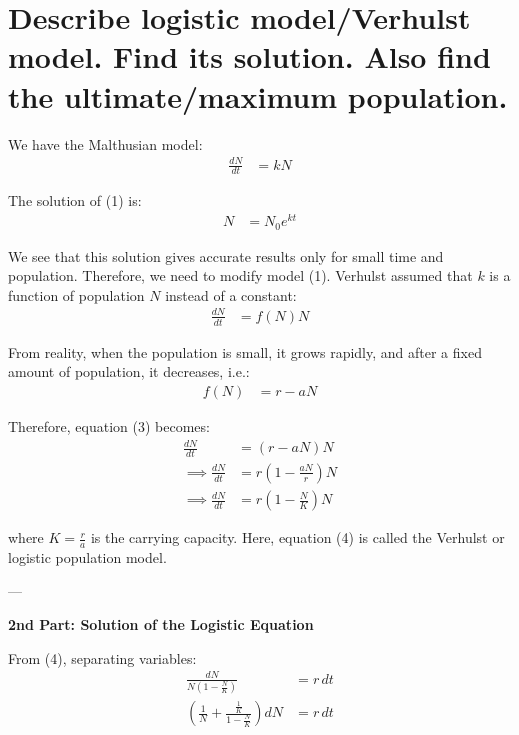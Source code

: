 \section{Describe logistic model/Verhulst model. Find its solution. Also find the ultimate/maximum population.}
We have the Malthusian model:
\begin{align*}
    \frac{dN}{dt} &= kN \tag{1}
\end{align*}

The solution of (1) is:
\begin{align*}
    N &= N_0 e^{kt} \tag{2}
\end{align*}

We see that this solution gives accurate results only for small time and population. Therefore, we need to modify model (1). Verhulst assumed that $k$ is a function of population $N$ instead of a constant:
\begin{align*}
    \frac{dN}{dt} &= f(N) N \tag{3}
\end{align*}

From reality, when the population is small, it grows rapidly, and after a fixed amount of population, it decreases, i.e.:
\begin{align*}
    f(N) &= r - aN
\end{align*}

Therefore, equation (3) becomes:
\begin{align*}
    \frac{dN}{dt} &= (r - aN) N \\
    \implies \frac{dN}{dt} &= r \left(1 - \frac{aN}{r}\right) N \\
    \implies \frac{dN}{dt} &= r \left(1 - \frac{N}{K}\right) N \tag{4}
\end{align*}

where $K = \frac{r}{a}$ is the carrying capacity. Here, equation (4) is called the Verhulst or logistic population model.

---

\textbf{2nd Part: Solution of the Logistic Equation}

From (4), separating variables:
\begin{align*}
    \frac{dN}{N\left(1 - \frac{N}{K}\right)} &= r \, dt \\
    \left(\frac{1}{N} + \frac{\frac{1}{K}}{1 - \frac{N}{K}}\right) dN &= r \, dt
\end{align*}

